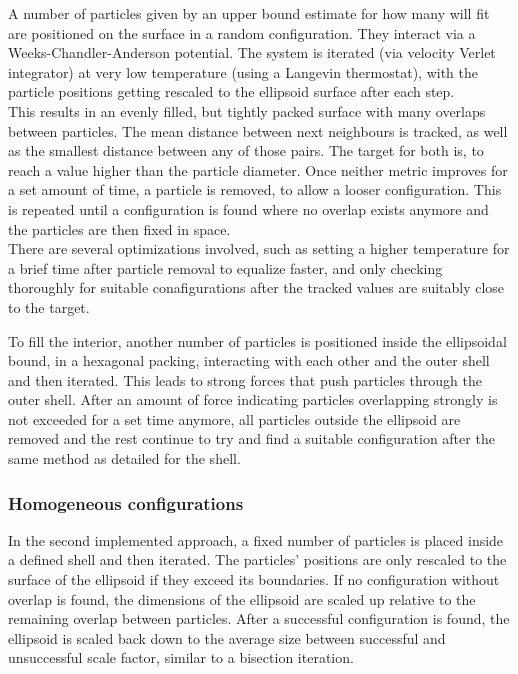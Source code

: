 \documentclass[12pt, DIV=12]{scrartcl}
\begin{document}
A number of particles given by an upper bound estimate for how many will fit are positioned on the surface in a random configuration. They interact via a Weeks-Chandler-Anderson potential. The system is iterated (via velocity Verlet integrator) at very low temperature (using a Langevin thermostat), with the particle positions getting rescaled to the ellipsoid surface after each step.\\
This results in an evenly filled, but tightly packed surface with many overlaps between particles. The mean distance between next neighbours is tracked, as well as the smallest distance between any of those pairs. The target for both is, to reach a value higher than the particle diameter. Once neither metric improves for a set amount of time, a particle is removed, to allow a looser configuration. This is repeated until a configuration is found where no overlap exists anymore and the particles are then fixed in space.\\
There are several optimizations involved, such as setting a higher temperature for a brief time after particle removal to equalize faster, and only checking thoroughly for suitable conafigurations after the tracked values are suitably close to the target.

To fill the interior, another number of particles is positioned inside the ellipsoidal bound, in a hexagonal packing, interacting with each other and the outer shell and then iterated. This leads to strong forces that push particles through the outer shell. After an amount of force indicating particles overlapping strongly is not exceeded for a set time anymore, all particles outside the ellipsoid are removed and the rest continue to try and find a suitable configuration after the same method as detailed for the shell.


\subsubsection{Homogeneous configurations}
In the second implemented approach, a fixed number of particles is placed inside a defined shell and then iterated. The particles' positions are only rescaled to the surface of the ellipsoid if they exceed its boundaries. If no configuration without overlap is found, the dimensions of the ellipsoid are scaled up relative to the remaining overlap between particles. After a successful configuration is found, the ellipsoid is scaled back down to the average size between successful and unsuccessful scale factor, similar to a bisection iteration.
\end{document}
